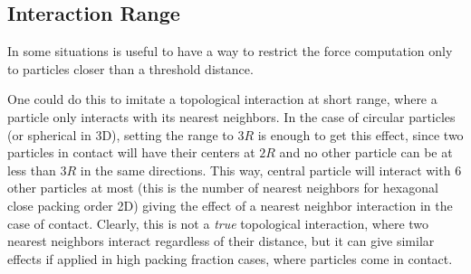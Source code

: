\documentclass[../../master_thesis_np.tex]{subfiles}
\begin{document}
		
	\subsection{Interaction Range} \label{intrange}
	In some situations is useful to have a way to restrict the force computation only to particles closer than a threshold distance.
		
	One could do this to imitate a topological interaction at short range, where a particle only interacts with its nearest neighbors. 
	In the case of circular particles (or spherical in 3D), setting the range to $3R$ is enough to get this effect, since two particles in contact will have their centers at $2R$ and no other particle can be at less than $3R$ in the same directions. 
	This way, central particle will interact with 6 other particles at most (this is the number of nearest neighbors for hexagonal close packing order 2D) giving the effect of a nearest neighbor interaction in the case of contact. 
	Clearly, this is not a \emph{true} topological interaction, where two nearest neighbors interact regardless {\color{brown}of} their distance, but it can give similar effects if applied in high packing fraction cases, where particles come in contact.
	
\end{document}
